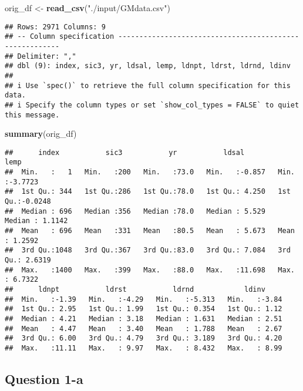 \documentclass[
]{article}
\newenvironment{Shaded}{\begin{snugshade}}{\end{snugshade}}
\newcommand{\FunctionTok}[1]{\textcolor[rgb]{0.13,0.29,0.53}{\textbf{#1}}}
\newcommand{\NormalTok}[1]{#1}
\newcommand{\OtherTok}[1]{\textcolor[rgb]{0.56,0.35,0.01}{#1}}
\newcommand{\StringTok}[1]{\textcolor[rgb]{0.31,0.60,0.02}{#1}}
\begin{document}
\begin{Shaded}
\begin{Highlighting}[]
\NormalTok{orig\_df }\OtherTok{\textless{}{-}} \FunctionTok{read\_csv}\NormalTok{(}\StringTok{"./input/GMdata.csv"}\NormalTok{)}
\end{Highlighting}
\end{Shaded}

\begin{verbatim}
## Rows: 2971 Columns: 9
## -- Column specification --------------------------------------------------------
## Delimiter: ","
## dbl (9): index, sic3, yr, ldsal, lemp, ldnpt, ldrst, ldrnd, ldinv
## 
## i Use `spec()` to retrieve the full column specification for this data.
## i Specify the column types or set `show_col_types = FALSE` to quiet this message.
\end{verbatim}

\begin{Shaded}
\begin{Highlighting}[]
\FunctionTok{summary}\NormalTok{(orig\_df)}
\end{Highlighting}
\end{Shaded}

\begin{verbatim}
##      index           sic3           yr           ldsal             lemp        
##  Min.   :   1   Min.   :200   Min.   :73.0   Min.   :-0.857   Min.   :-3.7723  
##  1st Qu.: 344   1st Qu.:286   1st Qu.:78.0   1st Qu.: 4.250   1st Qu.:-0.0248  
##  Median : 696   Median :356   Median :78.0   Median : 5.529   Median : 1.1142  
##  Mean   : 696   Mean   :331   Mean   :80.5   Mean   : 5.673   Mean   : 1.2592  
##  3rd Qu.:1048   3rd Qu.:367   3rd Qu.:83.0   3rd Qu.: 7.084   3rd Qu.: 2.6319  
##  Max.   :1400   Max.   :399   Max.   :88.0   Max.   :11.698   Max.   : 6.7322  
##      ldnpt           ldrst           ldrnd            ldinv      
##  Min.   :-1.39   Min.   :-4.29   Min.   :-5.313   Min.   :-3.84  
##  1st Qu.: 2.95   1st Qu.: 1.99   1st Qu.: 0.354   1st Qu.: 1.12  
##  Median : 4.21   Median : 3.18   Median : 1.631   Median : 2.51  
##  Mean   : 4.47   Mean   : 3.40   Mean   : 1.788   Mean   : 2.67  
##  3rd Qu.: 6.00   3rd Qu.: 4.79   3rd Qu.: 3.189   3rd Qu.: 4.20  
##  Max.   :11.11   Max.   : 9.97   Max.   : 8.432   Max.   : 8.99
\end{verbatim}

\hypertarget{question-1-a}{%
\subsection{Question 1-a}\label{question-1-a}}
\end{document}
